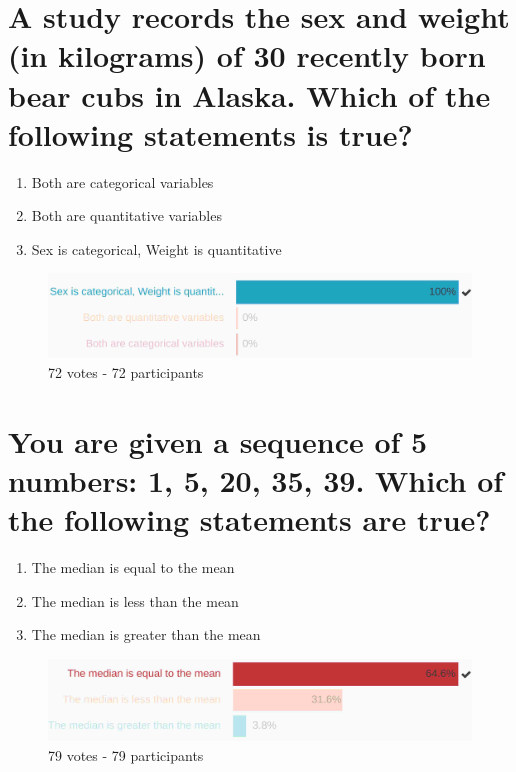 \documentclass[letterpaper,10pt,twoside,printwatermark=false]{pinp}
\providecommand{\tightlist}{%
  \setlength{\itemsep}{0pt}\setlength{\parskip}{0pt}}
\begin{document}
\newpage

\section{A study records the sex and weight (in kilograms) of 30
recently born bear cubs in Alaska. Which of the following statements is
true?}\label{a-study-records-the-sex-and-weight-in-kilograms-of-30-recently-born-bear-cubs-in-alaska.-which-of-the-following-statements-is-true}

\begin{enumerate}
\def\labelenumi{\arabic{enumi}.}
\tightlist
\item
  Both are categorical variables
\item
  Both are quantitative variables
\item
  Sex is categorical, Weight is quantitative
\end{enumerate}

\begin{figure}[H]
  \begin{center}
    \includegraphics[scale=0.15]{q2.jpg} 
  \end{center}
  \caption{72 votes - 72 participants}
\end{figure}

\section{You are given a sequence of 5 numbers: 1, 5, 20, 35, 39. Which
of the following statements are
true?}\label{you-are-given-a-sequence-of-5-numbers-1-5-20-35-39.-which-of-the-following-statements-are-true}

\begin{enumerate}
\def\labelenumi{\arabic{enumi}.}
\tightlist
\item
  The median is equal to the mean
\item
  The median is less than the mean
\item
  The median is greater than the mean
\end{enumerate}

\begin{figure}[H]
  \begin{center}
    \includegraphics[scale=0.15]{q3.jpg} 
  \end{center}
  \caption{79 votes - 79 participants}
\end{figure}
\end{document}
